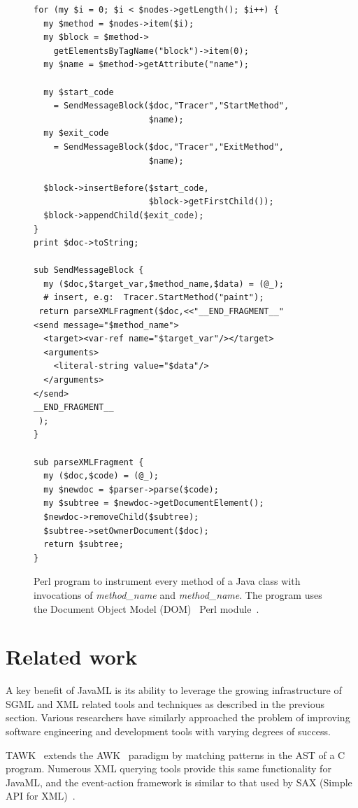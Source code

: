 \documentclass{article}
\begin{document}
\begin{multicols}{2}
\begin{figure}[htbp]
\begin{minipage}[b]{0.55\linewidth}
{\begin{verbatim}
for (my $i = 0; $i < $nodes->getLength(); $i++) {
  my $method = $nodes->item($i);
  my $block = $method->
    getElementsByTagName("block")->item(0);
  my $name = $method->getAttribute("name");

  my $start_code
    = SendMessageBlock($doc,"Tracer","StartMethod",
                       $name);
  my $exit_code 
    = SendMessageBlock($doc,"Tracer","ExitMethod",
                       $name);

  $block->insertBefore($start_code,
                       $block->getFirstChild());
  $block->appendChild($exit_code);
}
print $doc->toString;

sub SendMessageBlock {
  my ($doc,$target_var,$method_name,$data) = (@_);
  # insert, e.g:  Tracer.StartMethod("paint");
 return parseXMLFragment($doc,<<"__END_FRAGMENT__"
<send message="$method_name">
  <target><var-ref name="$target_var"/></target>
  <arguments>
    <literal-string value="$data"/>
  </arguments>
</send>  
__END_FRAGMENT__
 );
}

sub parseXMLFragment {
  my ($doc,$code) = (@_);
  my $newdoc = $parser->parse($code);
  my $subtree = $newdoc->getDocumentElement();
  $newdoc->removeChild($subtree);
  $subtree->setOwnerDocument($doc);
  return $subtree;
}
\end{verbatim}
}
\caption{Perl program to instrument every method of a Java class with invocations of
  \textit{method\_name}\smtexttt{)} and
  \textit{method\_name}\smtexttt{)}.  The
  program uses the Document Object Model (DOM)~\cite{DOM} Perl
  module~\cite{perlDOM}.
\label{fig:dom-instrument}}
\end{minipage}
\end{figure}

\section{Related work}
\label{sec-related}

A key benefit of JavaML is its ability to leverage the growing
infrastructure of SGML and XML related tools and techniques as described
in the previous section.  Various researchers have similarly approached
the problem of improving software engineering and development tools with
varying degrees of success.

TAWK~\cite{Griswold96} extends the AWK~\cite{Dougherty90} paradigm by matching
patterns in the AST of a C program.  Numerous XML querying tools provide
this same functionality for JavaML, and the event-action framework is
similar to that used by SAX (Simple API for XML)~\cite{SAX}.


\end{multicols}
\end{document}
